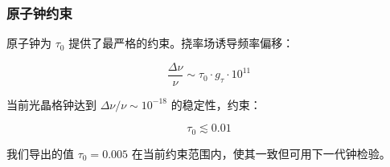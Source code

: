 \subsubsection{原子钟约束}

原子钟为 $\tau_0$ 提供了最严格的约束。挠率场诱导频率偏移：

\begin{equation}
    \frac{\Delta \nu}{\nu} \sim \tau_0 \cdot g_\tau \cdot 10^{11}
\end{equation}

当前光晶格钟达到 $\Delta\nu/\nu \sim 10^{-18}$ 的稳定性，约束：

\begin{equation}
    \tau_0 \lesssim 0.01
\end{equation}

我们导出的值 $\tau_0 = 0.005$ 在当前约束范围内，使其一致但可用下一代钟检验。
